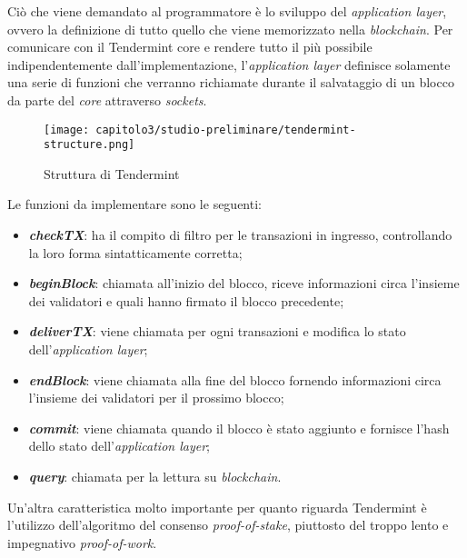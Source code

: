 Ciò che viene demandato al programmatore è lo sviluppo del \textit{application layer}, ovvero la definizione di tutto quello che viene memorizzato nella \textit{blockchain}. Per comunicare con il Tendermint core e rendere tutto il più possibile indipendentemente dall'implementazione, l'\textit{application layer} definisce solamente una serie di funzioni che verranno richiamate durante il salvataggio di un blocco da parte del \textit{core} attraverso \textit{sockets}.

\begin{figure}[h!]
  \centering
  \texttt{[image: capitolo3/studio-preliminare/tendermint-structure.png]}
  \caption{Struttura di Tendermint}
  \label{fig:tendermint-structure}
\end{figure}

\noindent Le funzioni da implementare sono le seguenti:
\begin{itemize}
  \item \textbf{\textit{checkTX}}: ha il compito di filtro per le transazioni in ingresso, controllando la loro forma sintatticamente corretta;
  \item \textbf{\textit{beginBlock}}: chiamata all'inizio del blocco, riceve informazioni circa l'insieme dei validatori e quali hanno firmato il blocco precedente;
  \item \textbf{\textit{deliverTX}}: viene chiamata per ogni transazioni e modifica lo stato dell'\textit{application layer};
  \item \textbf{\textit{endBlock}}: viene chiamata alla fine del blocco fornendo informazioni circa l'insieme dei validatori per il prossimo blocco;
  \item \textbf{\textit{commit}}: viene chiamata quando il blocco è stato aggiunto e fornisce l'hash dello stato dell'\textit{application layer};
  \item \textbf{\textit{query}}: chiamata per la lettura su \textit{blockchain}.
\end{itemize}

Un'altra caratteristica molto importante per quanto riguarda Tendermint è l'utilizzo dell'algoritmo del consenso \textit{proof-of-stake}, piuttosto del troppo lento e impegnativo \textit{proof-of-work}.

